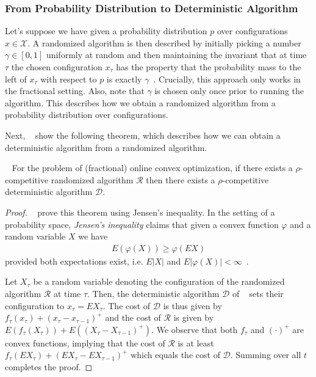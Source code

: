 \subsubsection{From Probability Distribution to Deterministic Algorithm}

Let's suppose we have given a probability distribution $p$ over configurations $x \in \mathcal{X}$. A randomized algorithm is then described by initially picking a number $\gamma \in [0,1]$ uniformly at random and then maintaining the invariant that at time $\tau$ the chosen configuration $x_{\tau}$ has the property that the probability mass to the left of $x_{\tau}$ with respect to $p$ is exactly $\gamma$~\cite{Bansal2015}. Crucially, this approach only works in the fractional setting. Also, note that $\gamma$ is chosen only once prior to running the algorithm. This describes how we obtain a randomized algorithm from a probability distribution over configurations.

Next, \citeauthor{Bansal2015}~\cite{Bansal2015} show the following theorem, which describes how we can obtain a deterministic algorithm from a randomized algorithm. \begin{theorem}
   ~\cite{Bansal2015} For the problem of (fractional) online convex optimization, if there exists a $\rho$-competitive randomized algorithm $\mathcal{R}$ then there exists a $\rho$-competitive deterministic algorithm $\mathcal{D}$.
\end{theorem}
\begin{proof}
\citeauthor{Bansal2015}~\cite{Bansal2015} prove this theorem using Jensen's inequality. In the setting of a probability space, \emph{Jensen's inequality} claims that given a convex function $\varphi$ and a random variable $X$ we have \begin{align}
    E(\varphi(X)) \geq \varphi(E X)
\end{align} provided both expectations exist, i.e. $E |X|$ and $E |\varphi(X)| < \infty$~\cite{Durrett2010}.

Let $X_{\tau}$ be a random variable denoting the configuration of the randomized algorithm $\mathcal{R}$ at time $\tau$. Then, the deterministic algorithm $\mathcal{D}$ of \citeauthor{Bansal2015}~\cite{Bansal2015} sets their configuration to $x_{\tau} = E X_{\tau}$. The cost of $\mathcal{D}$ is thus given by $f_{\tau}(x_{\tau}) + (x_{\tau} - x_{\tau-1})^+$ and the cost of $\mathcal{R}$ is given by $E(f_{\tau}(X_{\tau})) + E((X_{\tau} - X_{\tau-1})^+)$. We observe that both $f_{\tau}$ and $(\cdot)^+$ are convex functions, implying that the cost of $\mathcal{R}$ is at least $f_{\tau}(E X_{\tau}) + (E X_{\tau} - E X_{\tau-1})^+$ which equals the cost of $\mathcal{D}$. Summing over all $t$ completes the proof.
\end{proof}

